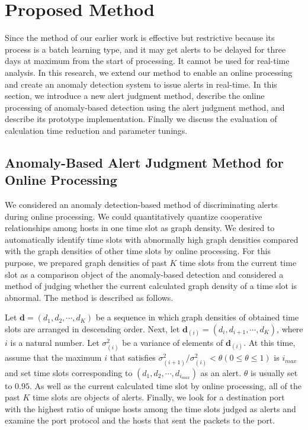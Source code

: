 \documentclass[letterpaper]{sig-alternate-10pt}
\begin{document}
\section{Proposed Method}
Since the method of our earlier work is effective but restrictive because its process is a batch learning type, and it may get alerts to be delayed for three days at maximum from the start of processing.
It cannot be used for real-time analysis.
In this research, we extend our method to enable an online processing and create an anomaly detection system to issue alerts in real-time.
In this section, we introduce a new alert judgment method, describe the online processing of anomaly-based detection using the alert judgment method, and describe its prototype implementation.
Finally we discuss the evaluation of calculation time reduction and parameter tunings.

\subsection{Anomaly-Based Alert Judgment Method for Online Processing}
We considered an anomaly detection-based method of discriminating alerts during online processing.
We could quantitatively quantize cooperative relationships among hosts in one time slot as graph density.
We desired to automatically identify time slots with abnormally high graph densities compared with the graph densities of other time slots by online processing.
For this purpose, we prepared graph densities of past $K$ time slots from the current time slot as a comparison object of the anomaly-based detection and considered a method of judging whether the current calculated graph density of a time slot is abnormal.
The method is described as follows.

Let $\bm{d} = (d_{1}, d_{2}, \cdots, d_{K})$ be a sequence in which graph densities of obtained time slots are arranged in descending order.
Next, let $\bm{d}_{(i)} = (d_{i}, d_{i+1},\cdots,d_{K})$, where $i$ is a natural number.
Let $\sigma^{2}_{(i)}$ be a variance of elements of $\bm{d}_{(i)}$.
At this time, assume that the maximum $i$ that satisfies $\sigma^{2}_{(i+1)}/\sigma^{2}_{(i)}<\theta (0\leq \theta \leq 1)$ is $i_{max}$ and set time slots corresponding to $(d_{1},d_{2},\cdots,d_{i_{max}})$ as an alert.
$\theta$ is usually set to $0.95$.
As well as the current calculated time slot by online processing, all of the past $K$ time slots are objects of alerts.
Finally, we look for a destination port with the highest ratio of unique hosts among the time slots judged as alerts and examine the port protocol and the hosts that sent the packets to the port.
\end{document}
